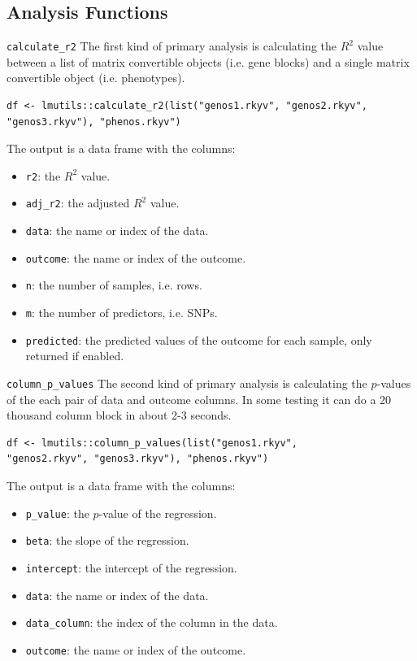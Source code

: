 \documentclass[10pt,handout]{beamer}
\begin{document}
\subsection{Analysis Functions}

\begin{frame}[fragile]{\texttt{calculate\_r2}}
  The first kind of primary analysis is calculating the $R^2$ value between a list of matrix convertible objects (i.e. gene blocks) and a single matrix convertible object (i.e. phenotypes).
\begin{verbatim}
df <- lmutils::calculate_r2(list("genos1.rkyv", "genos2.rkyv",
"genos3.rkyv"), "phenos.rkyv")
\end{verbatim}
  \pause
  The output is a data frame with the columns:
  \begin{itemize}[<+->]
    \item \texttt{r2}: the $R^2$ value.
    \item \texttt{adj\_r2}: the adjusted $R^2$ value.
    \item \texttt{data}: the name or index of the data.
    \item \texttt{outcome}: the name or index of the outcome.
    \item \texttt{n}: the number of samples, i.e. rows.
    \item \texttt{m}: the number of predictors, i.e. SNPs.
    \item \texttt{predicted}: the predicted values of the outcome for each sample, only returned if enabled.
  \end{itemize}
\end{frame}

\begin{frame}[fragile]{\texttt{column\_p\_values}}
  The second kind of primary analysis is calculating the $p$-values of the each pair of data and outcome columns. In some testing it can do a 20 thousand column block in about 2-3 seconds.
  \begin{verbatim}
df <- lmutils::column_p_values(list("genos1.rkyv",
"genos2.rkyv", "genos3.rkyv"), "phenos.rkyv")
\end{verbatim}
  \pause
  The output is a data frame with the columns:
  \begin{itemize}[<+->]
    \item \texttt{p\_value}: the $p$-value of the regression.
    \item \texttt{beta}: the slope of the regression.
    \item \texttt{intercept}: the intercept of the regression.
    \item \texttt{data}: the name or index of the data.
    \item \texttt{data\_column}: the index of the column in the data.
    \item \texttt{outcome}: the name or index of the outcome.
  \end{itemize}
\end{frame}
\end{document}
